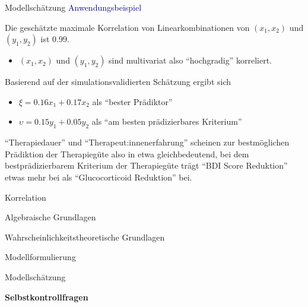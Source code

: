\documentclass[
  8pt,
  ignorenonframetext,
]{beamer}
\providecommand{\tightlist}{%
  \setlength{\itemsep}{0pt}\setlength{\parskip}{0pt}}
\begin{document}
\begin{frame}{Modellschätzung}
\protect\hypertarget{modellschuxe4tzung-7}{}
\textcolor{darkblue}{Anwendungsbeispiel}

\vspace{2mm}

\small

Die geschätzte maximale Korrelation von Linearkombinationen von
\((x_1,x_2)\) und \((y_1,y_2)\) ist 0.99.

\begin{itemize}
\tightlist
\item
  \((x_1,x_2)\) und \((y_1,y_2)\) sind multivariat also ``hochgradig''
  korreliert.
\end{itemize}

Basierend auf der simulationsvalidierten Schätzung ergibt sich

\begin{itemize}
\tightlist
\item
  \(\xi = 0.16x_1 + 0.17x_2\) als ``bester Prädiktor''
\item
  \(\upsilon = 0.15y_1 + 0.05y_2\) als ``am besten prädizierbares
  Kriterium''
\end{itemize}

``Therapiedauer'' und ``Therapeut:innenerfahrung'' scheinen zur
bestmöglichen Prädiktion der Therapiegüte also in etwa gleichbedeutend,
bei dem bestprädizierbarem Kriterium der Therapiegüte trägt ``BDI Score
Reduktion'' etwas mehr bei als ``Glucocorticoid Reduktion'' bei.
\end{frame}

\begin{frame}{}
\protect\hypertarget{section-9}{}
\vfill
\large

Korrelation

Algebraische Grundlagen

Wahrscheinlichkeitstheoretische Grundlagen

Modellformulierung

Modellschätzung

\textbf{Selbstkontrollfragen}
\end{frame}
\end{document}
